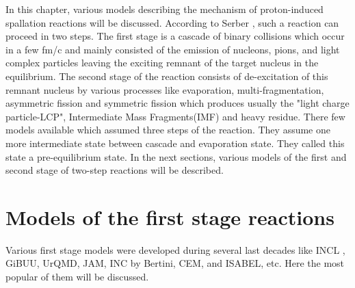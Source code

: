 In this chapter, various models describing the mechanism of proton-induced spallation reactions will be discussed. According to Serber \cite{Serber}, such a reaction can proceed in two steps. The first stage is a cascade of binary collisions which occur in a few fm/c and mainly consisted of the emission of nucleons, pions, and light complex particles leaving the exciting remnant of the target nucleus in the equilibrium.  The second stage of the reaction consists of de-excitation of this remnant nucleus by various processes like evaporation, multi-fragmentation, asymmetric fission and symmetric fission which produces usually the "light charge particle-LCP", Intermediate Mass Fragments(IMF) and heavy residue. There few models available which assumed three steps of the reaction. They assume one more intermediate state between cascade and evaporation state. They called this state a pre-equilibrium state. In the next sections, various models of the first and second stage of two-step reactions will be described.
\section{Models of the first stage reactions}
Various first stage models were developed during several last decades like INCL \cite{INCLCugnon1981,INCLboudard2002intranuclear,INCLboudard2004new,INCLboudard2013new,INCLMancusi2014}, GiBUU\cite{GiBUUBuss2012}, UrQMD\cite{UrQMDBASS1998,UrQMDBleicher1999}, JAM\cite{JAM_NARA1999}, INC by Bertini\cite{Bertini1963,Bertini1969}, CEM\cite{CEM_GUDIMA1983}, and ISABEL\cite{Isabel_Yariv1979,Isabel_Yariv1981}, etc. Here the most popular of them will be discussed.

